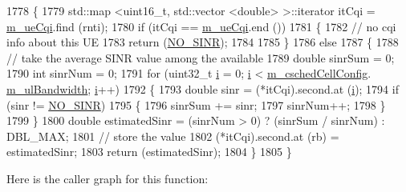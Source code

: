 \begin{DoxyCode}
1778 \{
1779   std::map <uint16\_t, std::vector <double> >::iterator itCqi = \hyperlink{classns3_1_1PssFfMacScheduler_abd1f917911a86bfd576e93ec67d7b8b2}{m\_ueCqi}.find (rnti);
1780   \textcolor{keywordflow}{if} (itCqi == \hyperlink{classns3_1_1PssFfMacScheduler_abd1f917911a86bfd576e93ec67d7b8b2}{m\_ueCqi}.end ())
1781     \{
1782       \textcolor{comment}{// no cqi info about this UE}
1783       \textcolor{keywordflow}{return} (\hyperlink{cqa-ff-mac-scheduler_8h_a520d71777be043568160c783a9c65fd5}{NO\_SINR});
1784 
1785     \}
1786   \textcolor{keywordflow}{else}
1787     \{
1788       \textcolor{comment}{// take the average SINR value among the available}
1789       \textcolor{keywordtype}{double} sinrSum = 0;
1790       \textcolor{keywordtype}{int} sinrNum = 0;
1791       \textcolor{keywordflow}{for} (uint32\_t \hyperlink{bernuolliDistribution_8m_a6f6ccfcf58b31cb6412107d9d5281426}{i} = 0; \hyperlink{bernuolliDistribution_8m_a6f6ccfcf58b31cb6412107d9d5281426}{i} < \hyperlink{classns3_1_1PssFfMacScheduler_a6808e2b2024ed0ced82f80bfe6f0801f}{m\_cschedCellConfig}.
      \hyperlink{structns3_1_1FfMacCschedSapProvider_1_1CschedCellConfigReqParameters_a5ab5b102878e6e7e7727a14af4a64d2f}{m\_ulBandwidth}; \hyperlink{bernuolliDistribution_8m_a6f6ccfcf58b31cb6412107d9d5281426}{i}++)
1792         \{
1793           \textcolor{keywordtype}{double} sinr = (*itCqi).second.at (\hyperlink{bernuolliDistribution_8m_a6f6ccfcf58b31cb6412107d9d5281426}{i});
1794           \textcolor{keywordflow}{if} (sinr != \hyperlink{cqa-ff-mac-scheduler_8h_a520d71777be043568160c783a9c65fd5}{NO\_SINR})
1795             \{
1796               sinrSum += sinr;
1797               sinrNum++;
1798             \}
1799         \}
1800       \textcolor{keywordtype}{double} estimatedSinr = (sinrNum > 0) ? (sinrSum / sinrNum) : DBL\_MAX;
1801       \textcolor{comment}{// store the value}
1802       (*itCqi).second.at (rb) = estimatedSinr;
1803       \textcolor{keywordflow}{return} (estimatedSinr);
1804     \}
1805 \}
\end{DoxyCode}


Here is the caller graph for this function\+:


